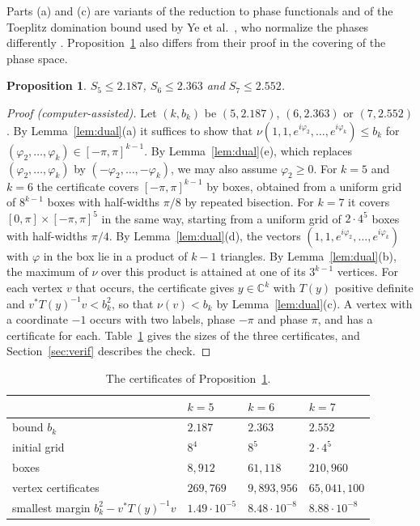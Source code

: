 \documentclass[11pt]{amsart}
\newtheorem{proposition}[theorem]{Proposition}
\theoremstyle{remark}
\numberwithin{equation}{section}
\newcommand{\C}{\mathbb{C}}
\newcommand{\FiveOwn}{2.187}
\newcommand{\NBoxes}{8{,}912}
\newcommand{\NVert}{269{,}769}
\newcommand{\SixOwn}{2.363}
\newcommand{\NBoxesSix}{61{,}118}
\newcommand{\NVertSix}{9{,}893{,}956}
\newcommand{\MinSlackSix}{$8.48\cdot10^{-8}$}
\newcommand{\MinSlack}{$1.49\cdot10^{-5}$}
\newcommand{\SevenOwn}{2.552}
\newcommand{\NBoxesSeven}{210{,}960}
\newcommand{\NVertSeven}{65{,}041{,}100}
\newcommand{\MinSlackSeven}{$8.88\cdot10^{-8}$}
\begin{document}
Parts (a) and (c) are variants of the reduction to phase functionals and of the Toeplitz domination bound used by Ye et al.\ \cite[(14) and Proposition~3.2]{Ye26}, who normalize the phases differently \cite[(17)]{Ye26}. Proposition~\ref{prop:s5} also differs from their proof in the covering of the phase space.

\begin{proposition}\label{prop:s5}
$S_5\le\FiveOwn$, $S_6\le\SixOwn$ and $S_7\le\SevenOwn$.
\end{proposition}

\begin{proof}[Proof \textup{(computer-assisted)}]
Let $(k,b_k)$ be $(5,\FiveOwn)$, $(6,\SixOwn)$ or $(7,\SevenOwn)$. By Lemma~\ref{lem:dual}(a) it suffices to show that $\nu(1,1,e^{i\varphi_2},\dots,e^{i\varphi_k})\le b_k$ for $(\varphi_2,\dots,\varphi_k)\in[-\pi,\pi]^{k-1}$. By Lemma~\ref{lem:dual}(e), which replaces $(\varphi_2,\dots,\varphi_k)$ by $(-\varphi_2,\dots,-\varphi_k)$, we may also assume $\varphi_2\ge0$. For $k=5$ and $k=6$ the certificate covers $[-\pi,\pi]^{k-1}$ by boxes, obtained from a uniform grid of $8^{k-1}$ boxes with half-widths $\pi/8$ by repeated bisection. For $k=7$ it covers $[0,\pi]\times[-\pi,\pi]^5$ in the same way, starting from a uniform grid of $2\cdot4^5$ boxes with half-widths $\pi/4$. By Lemma~\ref{lem:dual}(d), the vectors $(1,1,e^{i\varphi_2},\dots,e^{i\varphi_k})$ with $\varphi$ in the box lie in a product of $k-1$ triangles. By Lemma~\ref{lem:dual}(b), the maximum of $\nu$ over this product is attained at one of its $3^{k-1}$ vertices. For each vertex $v$ that occurs, the certificate gives $y\in\C^k$ with $T(y)$ positive definite and $v^*T(y)^{-1}v<b_k^2$, so that $\nu(v)<b_k$ by Lemma~\ref{lem:dual}(c). A vertex with a coordinate $-1$ occurs with two labels, phase $-\pi$ and phase $\pi$, and has a certificate for each. Table~\ref{tab:certs} gives the sizes of the three certificates, and Section~\ref{sec:verif} describes the check.
\end{proof}

\begin{table}[ht]
\centering
\caption{The certificates of Proposition~\ref{prop:s5}.}\label{tab:certs}
\begin{tabular}{@{}llll@{}}
\toprule
 & $k=5$ & $k=6$ & $k=7$\\
\midrule
bound $b_k$ & $\FiveOwn$ & $\SixOwn$ & $\SevenOwn$\\
initial grid & $8^4$ & $8^5$ & $2\cdot4^5$\\
boxes & $\NBoxes$ & $\NBoxesSix$ & $\NBoxesSeven$\\
vertex certificates & $\NVert$ & $\NVertSix$ & $\NVertSeven$\\
smallest margin $b_k^2-v^*T(y)^{-1}v$ & \MinSlack & \MinSlackSix & \MinSlackSeven\\
\bottomrule
\end{tabular}
\end{table}
\end{document}
